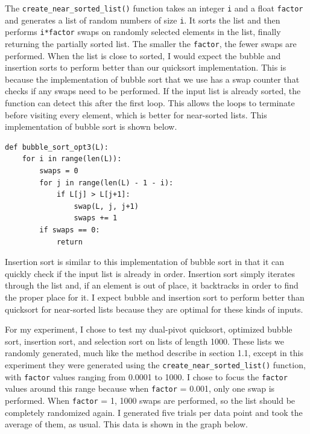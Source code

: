 \documentclass[12pt]{article}
\begin{document}
The \verb+create_near_sorted_list()+ function takes an integer \verb+i+ and a float \verb+factor+ and generates a list of random numbers of size \verb+i+. It sorts the list and then performs \verb+i*factor+ swaps on randomly selected elements in the list, finally returning the partially sorted list. The smaller the \verb+factor+, the fewer swaps are performed. When the list is close to sorted, I would expect the bubble and insertion sorts to perform better than our quicksort implementation. This is because the implementation of bubble sort that we use has a swap counter that checks if any swaps need to be performed. If the input list is already sorted, the function can detect this after the first loop. This allows the loops to terminate before visiting every element, which is better for near-sorted lists. This implementation of bubble sort is shown below.

\footnotesize
\begin{verbatim}
def bubble_sort_opt3(L):
    for i in range(len(L)):
        swaps = 0
        for j in range(len(L) - 1 - i):
            if L[j] > L[j+1]:
                swap(L, j, j+1)
                swaps += 1
        if swaps == 0:
            return
\end{verbatim}
\normalsize

\noindent Insertion sort is similar to this implementation of bubble sort in that it can quickly check if the input list is already in order. Insertion sort simply iterates through the list and, if an element is out of place, it backtracks in order to find the proper place for it. I expect bubble and insertion sort to perform better than quicksort for near-sorted lists because they are optimal for these kinds of inputs.

For my experiment, I chose to test my dual-pivot quicksort, optimized bubble sort, insertion sort, and selection sort on lists of length 1000. These lists we randomly generated, much like the method describe in section 1.1, except in this experiment they were generated using the \verb+create_near_sorted_list()+ function, with \verb+factor+ values ranging from 0.0001 to 1000. I chose to focus the \verb+factor+ values around this range because when \verb+factor+ = 0.001, only one swap is performed. When \verb+factor+ = 1, 1000 swaps are performed, so the list should be completely randomized again. I generated five trials per data point and took the average of them, as usual. This data is shown in the graph below.
\end{document}
